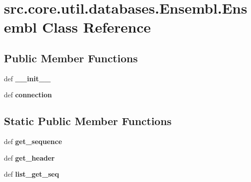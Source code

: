 \hypertarget{classsrc_1_1core_1_1util_1_1databases_1_1Ensembl_1_1Ensembl}{\section{src.\-core.\-util.\-databases.\-Ensembl.\-Ensembl Class Reference}
\label{classsrc_1_1core_1_1util_1_1databases_1_1Ensembl_1_1Ensembl}
}
\subsection*{Public Member Functions}
\begin{DoxyCompactItemize}
\item 
\hypertarget{classsrc_1_1core_1_1util_1_1databases_1_1Ensembl_1_1Ensembl_a1dc3d0a5667f131cd77be8bac22d4602}{def {\bfseries \-\_\-\-\_\-init\-\_\-\-\_\-}}\label{classsrc_1_1core_1_1util_1_1databases_1_1Ensembl_1_1Ensembl_a1dc3d0a5667f131cd77be8bac22d4602}

\item 
\hypertarget{classsrc_1_1core_1_1util_1_1databases_1_1Ensembl_1_1Ensembl_a81456966dbd60a73c87ffb64383571d0}{def {\bfseries connection}}\label{classsrc_1_1core_1_1util_1_1databases_1_1Ensembl_1_1Ensembl_a81456966dbd60a73c87ffb64383571d0}

\end{DoxyCompactItemize}
\subsection*{Static Public Member Functions}
\begin{DoxyCompactItemize}
\item 
\hypertarget{classsrc_1_1core_1_1util_1_1databases_1_1Ensembl_1_1Ensembl_a96b5cbb2a743faa1b7df8b14b1ce90f0}{def {\bfseries get\-\_\-sequence}}\label{classsrc_1_1core_1_1util_1_1databases_1_1Ensembl_1_1Ensembl_a96b5cbb2a743faa1b7df8b14b1ce90f0}

\item 
\hypertarget{classsrc_1_1core_1_1util_1_1databases_1_1Ensembl_1_1Ensembl_a3c15bb86cc8e1ad0f27800bc1d43c5d1}{def {\bfseries get\-\_\-header}}\label{classsrc_1_1core_1_1util_1_1databases_1_1Ensembl_1_1Ensembl_a3c15bb86cc8e1ad0f27800bc1d43c5d1}

\item 
\hypertarget{classsrc_1_1core_1_1util_1_1databases_1_1Ensembl_1_1Ensembl_a81538bec6fad9516f2739ef69568c627}{def {\bfseries list\-\_\-get\-\_\-seq}}\label{classsrc_1_1core_1_1util_1_1databases_1_1Ensembl_1_1Ensembl_a81538bec6fad9516f2739ef69568c627}

\end{DoxyCompactItemize}
